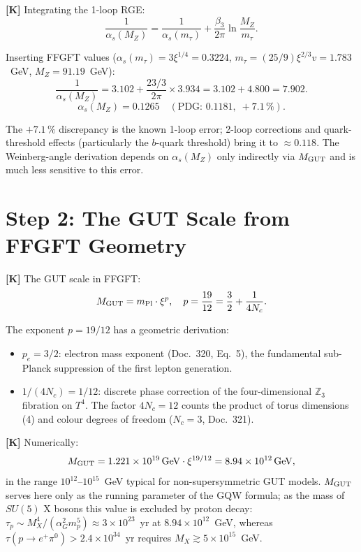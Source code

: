 \textbf{[K]} Integrating the 1-loop RGE:
\begin{equation}
  \frac{1}{\alpha_s(M_Z)}
  = \frac{1}{\alpha_s(m_\tau)} + \frac{\beta_3}{2\pi}\ln\!\frac{M_Z}{m_\tau}.
\end{equation}

Inserting FFGFT values ($\alpha_s(m_\tau) = 3\xi^{1/4} = 0.3224$,
$m_\tau = (25/9)\xi^{2/3}v = 1.783$~GeV, $M_Z = 91.19$~GeV):
\begin{equation}
  \frac{1}{\alpha_s(M_Z)}
  = 3.102 + \frac{23/3}{2\pi}\times3.934
  = 3.102 + 4.800 = 7.902.
\end{equation}
\begin{equation}
  \boxed{\alpha_s(M_Z) = 0.1265}
  \quad(\text{PDG: }0.1181,\;+7.1\,\%).
\end{equation}

The $+7.1\,\%$ discrepancy is the known 1-loop error; 2-loop
corrections and quark-threshold effects (particularly the $b$-quark
threshold) bring it to $\approx0.118$. The Weinberg-angle derivation
depends on $\alpha_s(M_Z)$ only indirectly via $M_{\rm GUT}$ and is
much less sensitive to this error.

\section{Step 2: The GUT Scale from FFGFT Geometry}

\textbf{[K]} The GUT scale in FFGFT:
\begin{equation}
  M_{\rm GUT} = m_{\rm Pl}\cdot\xi^{p},
  \quad p = \frac{19}{12} = \frac{3}{2} + \frac{1}{4N_c}.
  \label{eq:MGUT}
\end{equation}

The exponent $p = 19/12$ has a geometric derivation:
\begin{itemize}
  \item $p_e = 3/2$: electron mass exponent (Doc.~320, Eq.~5),
    the fundamental sub-Planck suppression of the first lepton
    generation.
  \item $1/(4N_c) = 1/12$: discrete phase correction of the
    four-dimensional $\mathbb{Z}_3$ fibration on $T^4$.
    The factor $4N_c = 12$ counts the product of torus dimensions
    (4) and colour degrees of freedom ($N_c=3$, Doc.~321).
\end{itemize}

\textbf{[K]} Numerically:
\begin{equation}
  M_{\rm GUT} = 1.221\times10^{19}\,\text{GeV}\cdot\xi^{19/12}
  = 8.94\times10^{12}\,\text{GeV},
\end{equation}
in the range $10^{12}$--$10^{15}$~GeV typical for non-supersymmetric
GUT models.
$M_{\rm GUT}$ serves here only as the running parameter of the GQW formula;
as the mass of $SU(5)$ X bosons this value is excluded by proton decay:
$\tau_p \sim M_X^4/(\alpha_G^2 m_p^5) \approx 3\times10^{23}$~yr at
$8.94\times10^{12}$~GeV, whereas $\tau(p\to e^+\pi^0) > 2.4\times10^{34}$~yr
requires $M_X \gtrsim 5\times10^{15}$~GeV.

